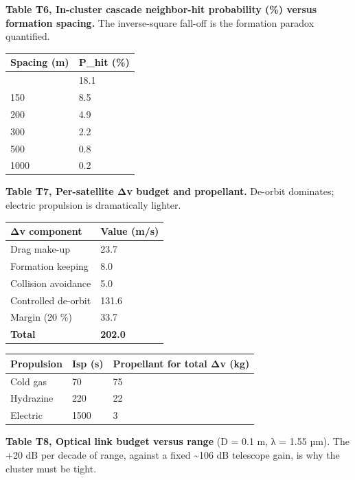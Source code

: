 \documentclass[
  11pt,
  openany,
  oneside]{book}
\newcounter{none} %
\begin{document}
\textbf{Table T6, In-cluster cascade neighbor-hit probability (\%)
versus formation spacing.} The inverse-square fall-off is the formation
paradox quantified.

{\def\LTcaptype{none} %
\begin{longtable}[]{@{}ll@{}}
\toprule\noalign{}
Spacing (m) & P\_hit (\%) \\
\midrule\noalign{}
\endhead
\bottomrule\noalign{}
\endlastfoot
100 & 18.1 \\
150 & 8.5 \\
200 & 4.9 \\
300 & 2.2 \\
500 & 0.8 \\
1000 & 0.2 \\
\end{longtable}
}

\textbf{Table T7, Per-satellite Δv budget and propellant.} De-orbit
dominates; electric propulsion is dramatically lighter.

{\def\LTcaptype{none} %
\begin{longtable}[]{@{}ll@{}}
\toprule\noalign{}
Δv component & Value (m/s) \\
\midrule\noalign{}
\endhead
\bottomrule\noalign{}
\endlastfoot
Drag make-up & 23.7 \\
Formation keeping & 8.0 \\
Collision avoidance & 5.0 \\
Controlled de-orbit & 131.6 \\
Margin (20 \%) & 33.7 \\
\textbf{Total} & \textbf{202.0} \\
\end{longtable}
}

{\def\LTcaptype{none} %
\begin{longtable}[]{@{}lll@{}}
\toprule\noalign{}
Propulsion & Isp (s) & Propellant for total Δv (kg) \\
\midrule\noalign{}
\endhead
\bottomrule\noalign{}
\endlastfoot
Cold gas & 70 & 75 \\
Hydrazine & 220 & 22 \\
Electric & 1500 & 3 \\
\end{longtable}
}

\textbf{Table T8, Optical link budget versus range} (D = 0.1 m, λ = 1.55
µm). The +20 dB per decade of range, against a fixed \textasciitilde106
dB telescope gain, is why the cluster must be tight.
\end{document}
